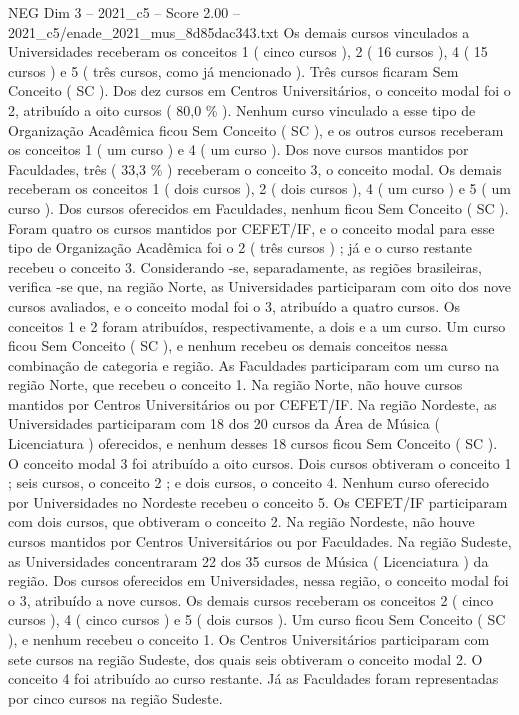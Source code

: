 \begin{textsample}{NEG Dim 3 – 2021\_c5 – Score 2.00 – 2021\_c5/enade\_2021\_mus\_8d85dac343.txt}
Os demais cursos vinculados a Universidades receberam os conceitos 1 ( cinco cursos ), 2 ( 16 cursos ), 4 ( 15 cursos ) e 5 ( três cursos, como já mencionado ).
Três cursos ficaram Sem Conceito ( SC ).
Dos dez cursos em Centros Universitários, o conceito modal foi o 2, atribuído a oito cursos ( 80,0 \% ).
Nenhum curso vinculado a esse tipo de Organização Acadêmica ficou Sem Conceito ( SC ), e os outros cursos receberam os conceitos 1 ( um curso ) e 4 ( um curso ).
Dos nove cursos mantidos por Faculdades, três ( 33,3 \% ) receberam o conceito 3, o conceito modal.
Os demais receberam os conceitos 1 ( dois cursos ), 2 ( dois cursos ), 4 ( um curso ) e 5 ( um curso ).
Dos cursos oferecidos em Faculdades, nenhum ficou Sem Conceito ( SC ).
Foram quatro os cursos mantidos por CEFET/IF, e o conceito modal para esse tipo de Organização Acadêmica foi o 2 ( três cursos ) ; já e o curso restante recebeu o conceito 3.
Considerando -se, separadamente, as regiões brasileiras, verifica -se que, na região Norte, as Universidades participaram com oito dos nove cursos avaliados, e o conceito modal foi o 3, atribuído a quatro cursos.
Os conceitos 1 e 2 foram atribuídos, respectivamente, a dois e a um curso.
Um curso ficou Sem Conceito ( SC ), e nenhum recebeu os demais conceitos nessa combinação de categoria e região.
As Faculdades participaram com um curso na região Norte, que recebeu o conceito 1.
Na região Norte, não houve cursos mantidos por Centros Universitários ou por CEFET/IF.
Na região Nordeste, as Universidades participaram com 18 dos 20 cursos da Área de Música ( Licenciatura ) oferecidos, e nenhum desses 18 cursos ficou Sem Conceito ( SC ).
O conceito modal 3 foi atribuído a oito cursos.
Dois cursos obtiveram o conceito 1 ; seis cursos, o conceito 2 ; e dois cursos, o conceito 4.
Nenhum curso oferecido por Universidades no Nordeste recebeu o conceito 5.
Os CEFET/IF participaram com dois cursos, que obtiveram o conceito 2.
Na região Nordeste, não houve cursos mantidos por Centros Universitários ou por Faculdades.
Na região Sudeste, as Universidades concentraram 22 dos 35 cursos de Música ( Licenciatura ) da região.
Dos cursos oferecidos em Universidades, nessa região, o conceito modal foi o 3, atribuído a nove cursos.
Os demais cursos receberam os conceitos 2 ( cinco cursos ), 4 ( cinco cursos ) e 5 ( dois cursos ).
Um curso ficou Sem Conceito ( SC ), e nenhum recebeu o conceito 1.
Os Centros Universitários participaram com sete cursos na região Sudeste, dos quais seis obtiveram o conceito modal 2.
O conceito 4 foi atribuído ao curso restante.
Já as Faculdades foram representadas por cinco cursos na região Sudeste.

\end{textsample}
